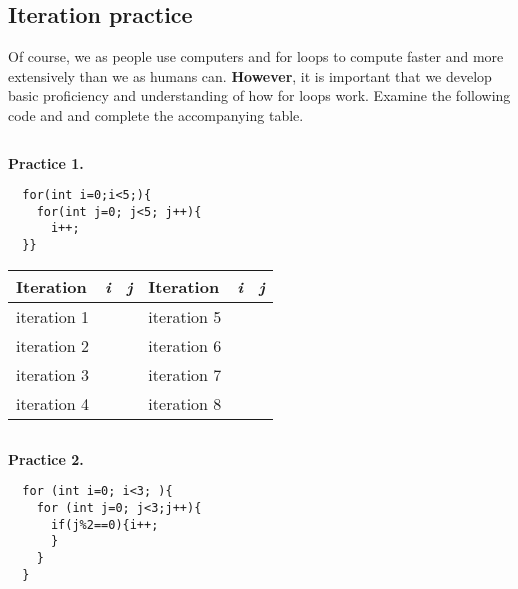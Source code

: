 \documentclass{article}
\begin{document}
\begin{flushleft}

\newpage

\subsection{Iteration practice}

Of course, we as people use computers and for loops to compute faster and more extensively than we as humans can. \textbf{However}, it is important that we develop basic proficiency and understanding of how for loops work.
Examine the following code and and complete the accompanying table.\par
\begin{verbatim}

\end{verbatim}
\noindent \textbf{Practice 1.}\\

\begin{verbatim}
  for(int i=0;i<5;){
    for(int j=0; j<5; j++){
      i++;
  }}
\end{verbatim}


\begin{tabu} to 120mm { | X[l] | X[c] |  X[c] | X[l] |  X[c] |  X[c] |}
  \hline
  \textbf{Iteration}  & \textbf{ \emph{i}} &  \textbf{ \emph{j}} &\textbf{Iteration}  & \textbf{ \emph{i}} &  \textbf{ \emph{j}} \\

 \hline
 iteration 1 &  &  & iteration 5 &  &  \\ 
 \hline
 iteration 2 &  &  & iteration 6 &  &  \\ 
 \hline
iteration 3 &  &  & iteration 7 &  &  \\ 
\hline
iteration 4 &  &  & iteration 8 &  &  \\ 
\hline
\end{tabu}

\begin{verbatim}
\end{verbatim}
\noindent \textbf{Practice 2.}\\
\begin{verbatim}
  for (int i=0; i<3; ){
    for (int j=0; j<3;j++){
      if(j%2==0){i++;
      }
    }
  }
\end{verbatim}


\end{flushleft}
\end{document}
